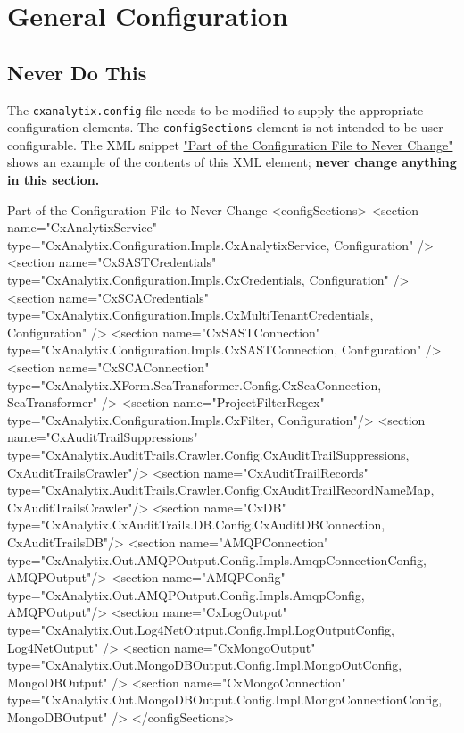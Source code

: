 \section{General Configuration}\label{sec:general}

\subsection{Never Do This}

The \texttt{cxanalytix.config} file needs to be modified to supply the appropriate configuration elements.  The \texttt{configSections}
element is not intended to be user configurable.  The XML snippet \hyperref[lst:motouch]{"Part of the Configuration File to Never Change"} shows an example of the contents of this XML element;
\textbf{never change anything in this section.}

\begin{code}{Part of the Configuration File to Never Change}{\label{lst:motouch}}{}
<configSections>
    <section name="CxAnalytixService" 
        type="CxAnalytix.Configuration.Impls.CxAnalytixService, Configuration" />
    <section name="CxSASTCredentials" 
        type="CxAnalytix.Configuration.Impls.CxCredentials, Configuration" />
    <section name="CxSCACredentials" 
        type="CxAnalytix.Configuration.Impls.CxMultiTenantCredentials, Configuration" />
    <section name="CxSASTConnection" 
        type="CxAnalytix.Configuration.Impls.CxSASTConnection, Configuration" />
    <section name="CxSCAConnection" 
        type="CxAnalytix.XForm.ScaTransformer.Config.CxScaConnection, ScaTransformer" />
    <section name="ProjectFilterRegex" 
        type="CxAnalytix.Configuration.Impls.CxFilter, Configuration"/>
    <section name="CxAuditTrailSuppressions" 
        type="CxAnalytix.AuditTrails.Crawler.Config.CxAuditTrailSuppressions, CxAuditTrailsCrawler"/>
    <section name="CxAuditTrailRecords" 
        type="CxAnalytix.AuditTrails.Crawler.Config.CxAuditTrailRecordNameMap, CxAuditTrailsCrawler"/>
    <section name="CxDB" 
        type="CxAnalytix.CxAuditTrails.DB.Config.CxAuditDBConnection, CxAuditTrailsDB"/>
    <section name="AMQPConnection" 
        type="CxAnalytix.Out.AMQPOutput.Config.Impls.AmqpConnectionConfig, AMQPOutput"/>
    <section name="AMQPConfig" 
        type="CxAnalytix.Out.AMQPOutput.Config.Impls.AmqpConfig, AMQPOutput"/>
    <section name="CxLogOutput" 
        type="CxAnalytix.Out.Log4NetOutput.Config.Impl.LogOutputConfig, Log4NetOutput" />
    <section name="CxMongoOutput" 
        type="CxAnalytix.Out.MongoDBOutput.Config.Impl.MongoOutConfig, MongoDBOutput" />
    <section name="CxMongoConnection" 
        type="CxAnalytix.Out.MongoDBOutput.Config.Impl.MongoConnectionConfig, MongoDBOutput" />
</configSections>
\end{code}


